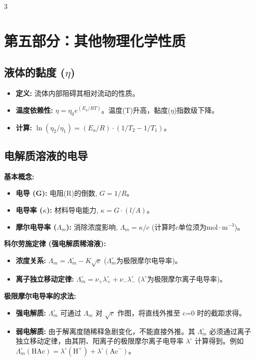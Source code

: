 \documentclass[a4paper,6pt]{article} %
\begin{document}
\begin{multicols}{3}
\section*{第五部分：其他物理化学性质}
\subsection*{液体的黏度 ($\eta$)}
\begin{itemize}
    \item \textbf{定义:} 流体内部阻碍其相对流动的性质。
    \item \textbf{温度依赖性:} $\eta = \eta_0e^{(E_a/RT)}$。温度(T)升高，黏度($\eta$)指数级下降。
    \item \textbf{计算:} $\ln(\eta_2/\eta_1) = (E_a/R) \cdot (1/T_2 - 1/T_1)$。
\end{itemize}

\subsection*{电解质溶液的电导}
\textbf{基本概念:}
\begin{itemize}
    \item \textbf{电导 (G):} 电阻(R)的倒数, $G = 1/R$。
    \item \textbf{电导率 ($\kappa$):} 材料导电能力, $\kappa = G \cdot (l/A)$。
    \item \textbf{摩尔电导率 ($\Lambda_m$):} 消除浓度影响, $\Lambda_m = \kappa / c$ (计算时c单位须为$\text{mol}\cdot\text{m}^{-3}$)。
\end{itemize}

\textbf{科尔劳施定律 (强电解质稀溶液):}
\begin{itemize}
    \item \textbf{浓度关系:} $\Lambda_m = \Lambda_m^\circ - K\sqrt{c}$ ($\Lambda_m^\circ$为极限摩尔电导率)。
    \item \textbf{离子独立移动定律:} $\Lambda_m^\circ = \nu_+ \lambda_+^\circ + \nu_- \lambda_-^\circ$ ($\lambda^\circ$为极限摩尔离子电导率)。
\end{itemize}

\textbf{极限摩尔电导率的求法:}
\begin{itemize}
    \item \textbf{强电解质:} $\Lambda_m^\circ$ 可通过 $\Lambda_m$ 对 $\sqrt{c}$ 作图，将直线外推至 c=0 时的截距求得。
    \item \textbf{弱电解质:} 由于解离度随稀释急剧变化，不能直接外推。其 $\Lambda_m^\circ$ 必须通过离子独立移动定律，由其阴、阳离子的极限摩尔离子电导率 $\lambda^\circ$ 计算得到。例如 $\Lambda_m^\circ(\text{HAc}) = \lambda^\circ(\text{H}^+) + \lambda^\circ(\text{Ac}^-)$。
\end{itemize}


\end{multicols}
\end{document}
